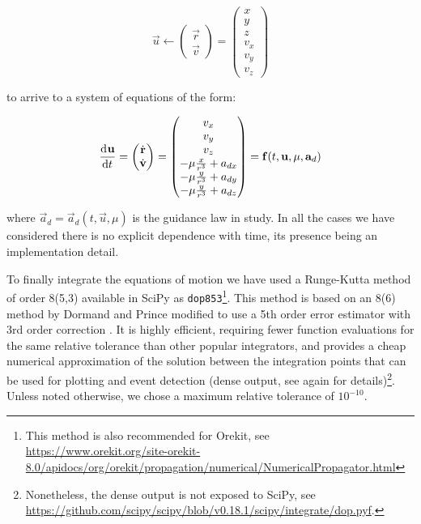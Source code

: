 \[
\vec{u} \longleftarrow \begin{pmatrix} \vec{r} \\ \vec{v} \end{pmatrix} = \begin{pmatrix} x \\ y \\ z \\ v_x \\ v_y \\ v_z \end{pmatrix}
\]

to arrive to a system of equations of the form:

\begin{equation}
\frac{\operatorname{d}\!^{} \mathbf{u}}{\operatorname{d}\! t^{}} = \begin{pmatrix} \dot{\mathbf{r}} \\ \dot{\mathbf{v}} \end{pmatrix} = \begin{pmatrix} v_x \\ v_y \\ v_z \\ -\mu \frac{x}{r^3} + a_{dx} \\ -\mu \frac{y}{r^3} + a_{dy} \\ -\mu \frac{y}{r^3} + a_{dz} \end{pmatrix} = \mathbf{f}(t, \mathbf{u}, \mu, \mathbf{a}_d)
\end{equation}

where $\vec{a}_d = \vec{a}_d(t, \vec{u}, \mu)$ is the guidance law in study. In all the cases we have considered there is no explicit dependence with time, its presence being an implementation detail.

To finally integrate the equations of motion we have used a Runge-Kutta method of order 8(5,3) available in SciPy as \verb|dop853|\footnote{This method is also recommended for Orekit, see \url{https://www.orekit.org/site-orekit-8.0/apidocs/org/orekit/propagation/numerical/NumericalPropagator.html}}. This method is based on an 8(6) method by Dormand and Prince modified to use a 5th order error estimator with 3rd order correction \cite{hairer1993solving}. It is highly efficient, requiring fewer function evaluations for the same relative tolerance than other popular integrators, and provides a cheap numerical approximation of the solution between the integration points that can be used for plotting and event detection (dense output, see again \cite{hairer1993solving} for details)\footnote{Nonetheless, the dense output is not exposed to SciPy, see \url{https://github.com/scipy/scipy/blob/v0.18.1/scipy/integrate/dop.pyf}.}. Unless noted otherwise, we chose a maximum relative tolerance of $10^{-10}$.


